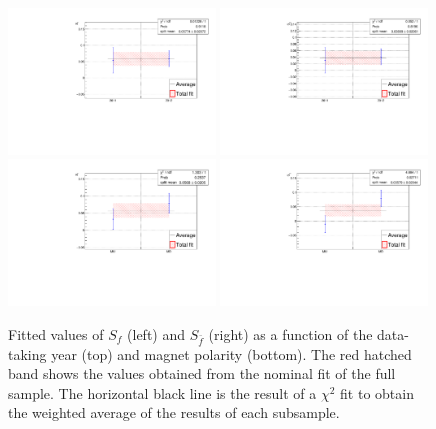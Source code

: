 \begin{figure}[htpb]
  \begin{center}
    \includegraphics[width=0.49\textwidth]{05DecaytimeFit/figs/splits/Sf_splits_Year.pdf}
    \includegraphics[width=0.49\textwidth]{05DecaytimeFit/figs/splits/Sfbar_splits_Year.pdf} \\
    \includegraphics[width=0.49\textwidth]{05DecaytimeFit/figs/splits/Sf_splits_Polarity.pdf}
    \includegraphics[width=0.49\textwidth]{05DecaytimeFit/figs/splits/Sfbar_splits_Polarity.pdf}
    \end{center}
  \vspace{-2mm}
  \caption{Fitted values of $S_f$ (left) and $S_{\bar f}$ (right) as a function of the data-taking year (top) and magnet polarity
  (bottom). The red hatched band shows the values obtained from the nominal fit of the full sample.
  The horizontal black line is the result of a $\chi^2$ fit to obtain the weighted average of the results of each subsample.}
  \label{fig:year_pol_splits}
\end{figure}

